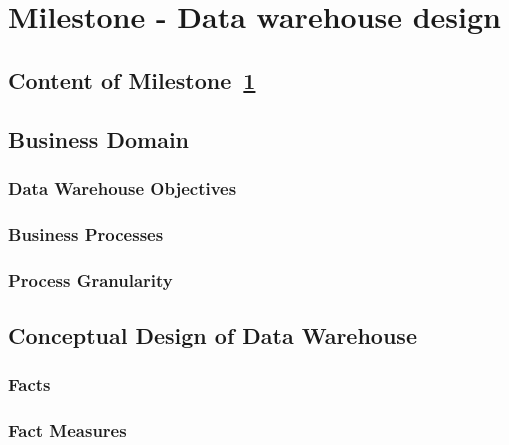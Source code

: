 


\chapter{Milestone - Data warehouse design} \label{cha:ml1}
    \section{Content of Milestone~\ref{cha:ml1}} 
        \label{sec:ml1_content}
    
    \section{Business Domain} \label{sec:ml1_domain}
    
        \subsection{Data Warehouse Objectives} \label{sub:ml1_objectives}
        
        \subsection{Business Processes} \label{sub:ml1_processes}
        
        \subsection{Process Granularity} \label{sub:ml1_granularity}
         
    \clearpage

    \section{Conceptual Design of Data Warehouse}
            \label{sec:ml1_design}  
        \subsection{Facts} \label{sub:ml1_facts}
        
        \subsection{Fact Measures} \label{sub:ml1_measures}
        
